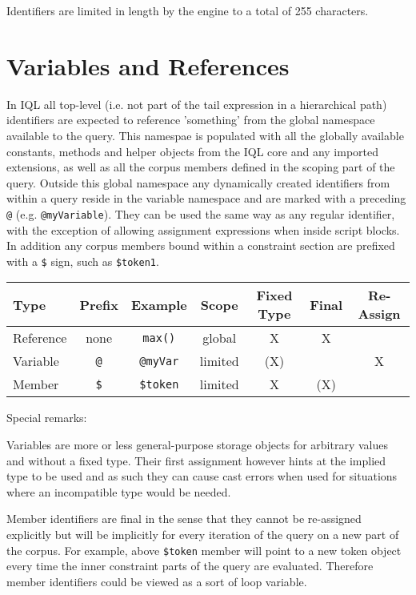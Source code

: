 \documentclass[11pt]{article}
\begin{document}
Identifiers are limited in length by the engine to a total of 255 characters. 

\section{Variables and References}
\label{sec:variables-references}

In IQL all top-level (i.e. not part of the tail expression in a hierarchical path) identifiers are expected to reference 'something' from the global namespace available to the query. This namespae is populated with all the globally available constants, methods and helper objects from the IQL core and any imported extensions, as well as all the corpus members defined in the scoping part of the query. Outside this global namespace any dynamically created identifiers from within a query reside in the variable namespace and are marked with a preceding \texttt{@} (e.g. \texttt{@myVariable}). They can be used the same way as any regular identifier, with the exception of allowing assignment expressions when inside script blocks. In addition any corpus members bound within a constraint section are prefixed with a \texttt{\$} sign, such as \texttt{\$token1}.

\begin{tabular}{|l|c|c|c|c|c|c|}
	\hline 
Type	& Prefix & Example & Scope & Fixed Type & Final & Re-Assign \\ 
	\hline 
Reference	& none & \texttt{max()} & global & X & X &  \\ 
	\hline 
Variable	& \texttt{@} & \texttt{@myVar} & limited & (X) &  & X \\ 
	\hline 
Member	& \texttt{\$} & \texttt{\$token} & limited & X & (X) &  \\ 
	\hline 
\end{tabular} 

Special remarks:

Variables are more or less general-purpose storage objects for arbitrary values and without a fixed type. Their first assignment however hints at the implied type to be used and as such they can cause cast errors when used for situations where an incompatible type would be needed.

Member identifiers are final in the sense that they cannot be re-assigned explicitly but will be implicitly for every iteration of the query on a new part of the corpus. For example, above \texttt{\$token} member will point to a new token object every time the inner constraint parts of the query are evaluated. Therefore member identifiers could be viewed as a sort of loop variable. 
\end{document}
